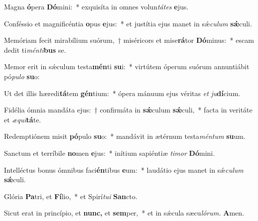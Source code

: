 \item Magna \textbf{ó}pera \textbf{Dó}mini:~* exquisíta in omnes volun\textit{tátes} \textbf{e}jus.
\item Conféssio et magnificéntia \textbf{o}pus \textbf{e}jus:~* et justítia ejus manet in sǽ\textit{culum} \textbf{sǽ}culi.
\item Memóriam fecit mirabílium suórum,~† miséricors et mise\textbf{rá}tor \textbf{Dó}minus:~* escam dedit ti\textit{ménti}\textbf{bus} se.
\item Memor erit in sǽculum testa\textbf{mén}ti \textbf{su}i:~* virtútem óperum suórum annuntiábit pó\textit{pulo} \textbf{su}o:
\item Ut det illis hæredi\textbf{tá}tem \textbf{gén}tium:~* ópera mánuum ejus véritas \textit{et} \textit{ju}\textbf{dí}cium.
\item Fidélia ómnia mandáta ejus:~† confirmáta in \textbf{sǽ}culum \textbf{sǽ}culi,~* facta in veritáte et \textit{æqui}\textbf{tá}te.
\item Redemptiónem misit \textbf{pó}pulo \textbf{su}o:~* mandávit in ætérnum testa\textit{méntum} \textbf{su}um.
\item Sanctum et terríbile \textbf{no}men \textbf{e}jus:~* inítium sapiéntiæ \textit{timor} \textbf{Dó}mini.
\item Intelléctus bonus ómnibus faci\textbf{én}tibus \textbf{e}um:~* laudátio ejus manet in sǽ\textit{culum} \textbf{sǽ}culi.
\item Glória \textbf{Pa}tri, et \textbf{Fí}lio,~* et Spirí\tinyhspace\textit{tui} \textbf{San}cto.
\item Sicut erat in princípio, et \textbf{nunc,} et \textbf{sem}per,~* et in sǽcula sæcu\tinyhspace\textit{lórum.} \textbf{A}men.